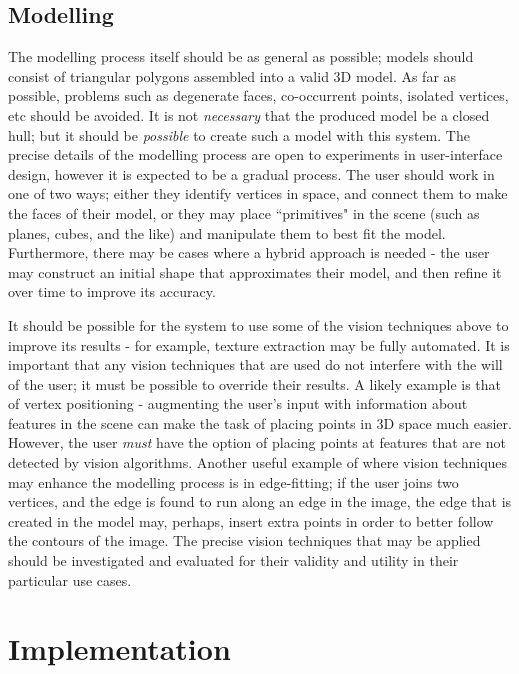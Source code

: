 \documentclass[a4paper,10pt]{article}
\begin{document}
\subsection{Modelling}
\label{approachmodel}
The modelling process itself should be as general as possible; models should consist of triangular polygons assembled into a valid 3D model. As far as possible, problems such as degenerate faces, co-occurrent points, isolated vertices, etc should be avoided. It is not \textit{necessary} that the produced model be a closed hull; but it should be \textit{possible} to create such a model with this system. The precise details of the modelling process are open to experiments in user-interface design, however it is expected to be a gradual process. The user should work in one of two ways; either they identify vertices in space, and connect them to make the faces of their model, or they may place ``primitives" in the scene (such as planes, cubes, and the like) and manipulate them to best fit the model. Furthermore, there may be cases where a hybrid approach is needed - the user may construct an initial shape that approximates their model, and then refine it over time to improve its accuracy.

It should be possible for the system to use some of the vision techniques above to improve its results - for example, texture extraction may be fully automated. It is important that any vision techniques that are used do not interfere with the will of the user; it must be possible to override their results. A likely example is that of vertex positioning - augmenting the user's input with information about features in the scene can make the task of placing points in 3D space much easier. However, the user \textit{must} have the option of placing points at features that are not detected by vision algorithms. Another useful example of where vision techniques may enhance the modelling process is in edge-fitting; if the user joins two vertices, and the edge is found to run along an edge in the image, the edge that is created in the model may, perhaps, insert extra points in order to better follow the contours of the image. The precise vision techniques that may be applied should be investigated and evaluated for their validity and utility in their particular use cases.

\clearpage

\section{Implementation}
\end{document}

